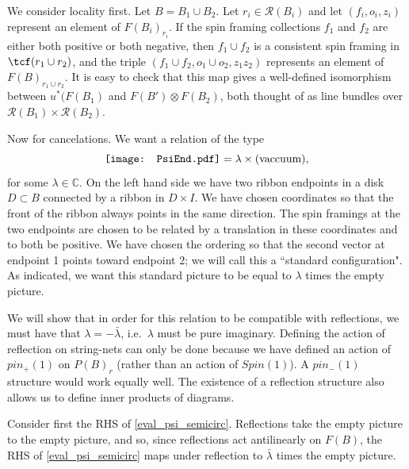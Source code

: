 \documentclass[12pt,a4paper]{article}
\newcommand{\cc}{\mathbb{C}}
\newcommand{\mcr}{\mathcal{R}}
\newcommand\be            {\begin{equation}}
\newcommand\ee            {\end{equation}}
\newcommand{\PsiEnd}{\mathord{\vcenter{\hbox{\texttt{[image: PsiEnd.pdf]}}}}}
\begin{document}
\medskip

We consider locality first.
Let $B = B_1 \cup B_2$.
Let $r_i \in \mcr(B_i)$ and let $(f_i, o_i, z_i)$ represent an element of $F(B_i)_{r_i}$.
If the spin framing collections $f_1$ and $f_2$ are either both positive or both negative, then
$f_1 \cup f_2$ is a consistent spin framing in $\tcf(r_1 \cup r_2)$, and the triple
$(f_1 \cup f_2, o_1\cup o_2, z_1 z_2)$ represents an element of $F(B)_{r_1\cup r_2}$.
It is easy to check that this map gives a well-defined  isomorphism between $u^*(F(B_1)$ and $F(B')\otimes F(B_2)$, both thought of as line bundles over $\mcr(B_1)\times\mcr(B_2)$.

\medskip

Now for cancelations.
We want a relation of the type 
\be \label{eval_psi_semicirc}
\PsiEnd  = \lambda \times \text{(vaccuum)},
 \ee
for some $\lambda \in \cc$. 
On the left hand side we have two ribbon endpoints in a disk $D \subset B$ connected by a ribbon in $D\times I$.
We have chosen coordinates so that the front of the ribbon always points in the same direction.
The spin framings at the two endpoints are chosen to be related by a translation in these coordinates
and to both be positive.
We have chosen the ordering so that the second vector at endpoint 1 points toward endpoint 2;
we will call this a ``standard configuration".
As indicated, we want this standard picture to be equal to $\lambda$ times the empty picture.

We will show that in order for this relation to be compatible with reflections, 
we must have that $\lambda = -\bar\lambda$, i.e.\ $\lambda$ must be pure imaginary.
Defining the action of reflection on string-nets can only be done because we have defined an action of $pin_+(1)$ on $P(B)_r$ (rather than an action of $Spin(1)$). 
A $pin_-(1)$ structure would work equally well. 
The existence of a reflection structure also allows us to define inner products of diagrams. 


Consider first the RHS of \eqref{eval_psi_semicirc}. 
Reflections take the empty picture to the empty picture, and so, since reflections act antilinearly on $F(B)$,
the RHS of \eqref{eval_psi_semicirc} maps under reflection to $\bar\lambda$ times the empty picture.
\end{document}
